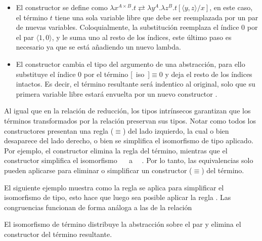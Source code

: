 \begin{itemize}
	\item El constructor  se define como $\lambda x^{A \times B}. t \rightleftarrows \lambda y^A. \lambda z^B. t[\langle y, z \rangle/x]$, en este caso, el término $t$ tiene una sola variable libre que debe ser reemplazada por un par de nuevas variables.
	Coloquialmente, la substitución  reemplaza el índice 0 por el par $\langle 1, 0 \rangle$, y le suma uno al resto de los índices, este último paso es necesario ya que se está añadiendo un nuevo lambda.
	
	\item El constructor  cambia el tipo del argumento de una abstracción, para ello substituye el índice 0 por el término [~iso~]$\equiv0$ y deja el resto de los índices intactos.
	Es decir, el término resultante será indentico al original, solo que su primera variable libre estará envuelta por un nuevo constructor \const{[\_]$\equiv$\_}.
\end{itemize}

Al igual que en la relación de reducción, los tipos intrínsecos garantizan que los términos transformados por la relación \type{$\_\rightleftarrows\_$} preservan sus tipos.
Notar como todos los constructores presentan una regla ($\equiv$) del lado izquierdo, la cual o bien desaparece del lado derecho, o bien se simplifica el isomorfismo de tipo aplicado.
Por ejemplo, el constructor  elimina la regla \const{[ comm ]$\equiv$\_} del término, mientras que el constructor  simplifica el isomorfismo \const{[ cong$\Rightarrow_2$}~~\const{]$\equiv$\_} a \const{[}~~\const{]$\equiv$\_}.
Por lo tanto, las equivalencias solo pueden aplicarse para eliminar o simplificar un constructor ($\equiv$) del término.

\begin{example}
	El siguiente ejemplo muestra como la regla  se aplica para simplificar el isomorfismo de tipo, esto hace que luego sea posible aplicar la regla .
	Las congruencias funcionan de forma análoga a las de la relación \type{$\_\hookrightarrow\_$}
\end{example}

\begin{example}
	El isomorfismo de término  distribuye la abstracción sobre el par y elimina el constructor  del término resultante.
\end{example}

